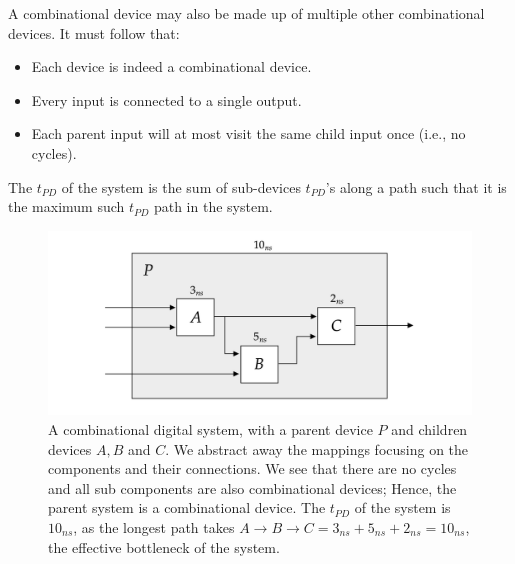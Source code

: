     \newpage 

    \begin{Def}

        \label{def:combinational_digital_systems}

        \noindent
        A combinational device may also be made up of multiple other combinational devices. It must follow that:
        \begin{itemize}
            \item Each device is indeed a combinational device.
            \item Every input is connected to a single output.
            \item Each parent input will at most visit the same child input once (i.e., no cycles).
        \end{itemize}

        \noindent
        The $t_{PD}$ of the system is the sum of sub-devices $t_{PD}$'s along a path such that it is the 
        maximum such $t_{PD}$ path in the system.
    \end{Def}

    \vspace{-1em}

    \begin{figure}[ht!]

        \centering
        \includegraphics[width=.9\textwidth]{./Sections/circuits/combin_system.png}
        \caption{A combinational digital system, with a parent device $P$ and children devices $A,B$ and $C$.
        We abstract away the mappings focusing on the components and their connections. We see that there are no cycles and 
        all sub components are also combinational devices; Hence, the parent system is a combinational device. The 
        $t_{PD}$ of the system is $10_{ns}$, as the longest path takes $A\to B \to C = 3_{ns} + 5_{ns} + 2_{ns} = 10_{ns}$, the 
        effective bottleneck of the system.
        }
        \label{fig:combinational_digital_systems}
    \end{figure}


